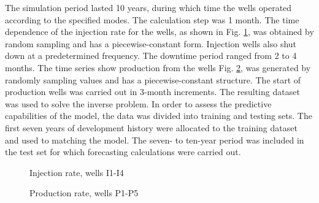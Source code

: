 \documentclass[
11pt,%
tightenlines,%
twoside,%
onecolumn,%
nofloats,%
nobibnotes,%
nofootinbib,%
superscriptaddress,%
noshowpacs,%
centertags]%
{revtex4}
\begin{document}
The simulation period lasted 10 years, during which time the wells operated according to the specified modes. The calculation step was 1 month. The time dependence of the injection rate for the wells, as shown in Fig. \ref{fig:inj_rate}, was obtained by random sampling and has a piecewise-constant form. Injection wells also shut down at a predetermined frequency. The downtime period ranged from 2 to 4 months. 
The time series show production from the wells Fig. \ref{fig:prod_rate}, was generated by randomly sampling values and has a piecewise-constant structure. The start of production wells was carried out in 3-month increments.
The resulting dataset was used to solve the inverse problem. In order to assess the predictive capabilities of the model, the data was divided into training and testing sets. The first seven years of development history were allocated to the training dataset and used to matching the model. The seven- to ten-year period was included in the test set for which forecasting calculations were carried out.

\begin{figure}
	\caption{Injection rate, wells I1-I4}
	\label{fig:inj_rate}
\end{figure}

\begin{figure}
	\caption{Production rate, wells P1-P5}
	\label{fig:prod_rate}
\end{figure}
\end{document}
